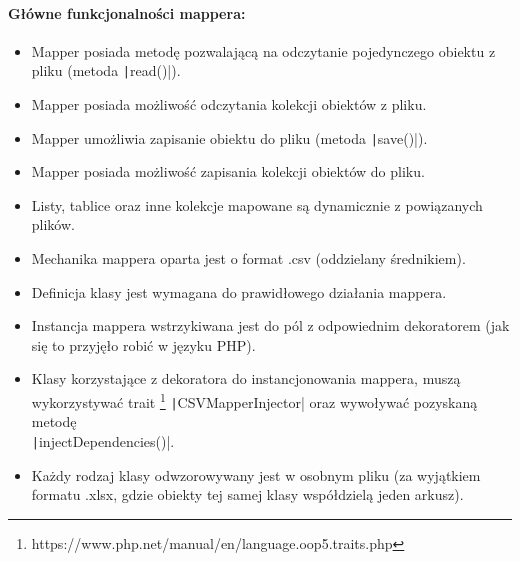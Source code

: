 \paragraph{Główne funkcjonalności mappera:}
\begin{itemize} 
	\item Mapper posiada metodę pozwalającą na odczytanie pojedynczego obiektu z pliku (metoda \texttt|read()|).
	\item Mapper posiada możliwość odczytania kolekcji obiektów z pliku.
	\item Mapper umożliwia zapisanie obiektu do pliku (metoda  \texttt|save()|).
	\item Mapper posiada możliwość zapisania kolekcji obiektów do pliku.
	\item Listy, tablice oraz inne kolekcje mapowane są dynamicznie z powiązanych plików.
	\item Mechanika mappera oparta jest o format .csv (oddzielany średnikiem).
	\item Definicja klasy jest wymagana do prawidłowego działania mappera.
	\item Instancja mappera wstrzykiwana jest do pól z odpowiednim dekoratorem (jak się to przyjęło robić w języku PHP).
	\item Klasy korzystające z dekoratora do instancjonowania mappera, muszą wykorzystywać trait \footnote{https://www.php.net/manual/en/language.oop5.traits.php} \texttt|CSVMapperInjector| oraz wywoływać pozyskaną metodę\\ \texttt|injectDependencies()|.
	\item Każdy rodzaj klasy odwzorowywany jest w osobnym pliku (za wyjątkiem formatu .xlsx, gdzie obiekty tej samej klasy współdzielą jeden arkusz).
\end{itemize}
